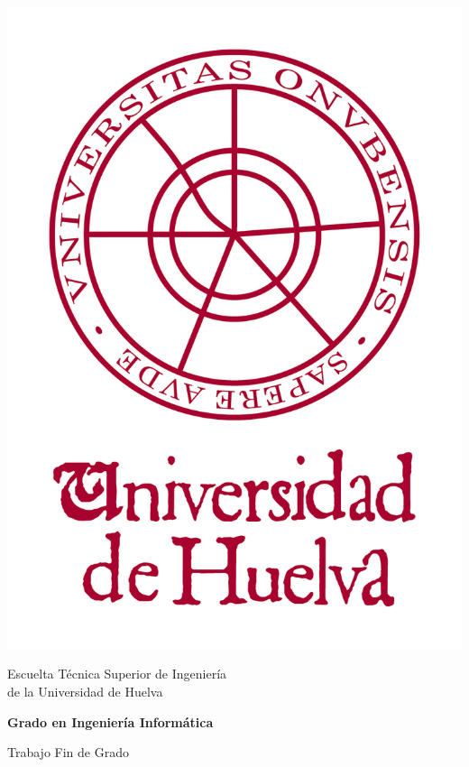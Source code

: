 \thispagestyle{empty}

{


\thispagestyle{empty}
\begin{center}
\includegraphics[scale=.6]{img/logouhu}
\end{center}

\vspace*{0cm}
\Large 

\begin{center}

{\normalsize \sc Escuelta Técnica Superior de Ingeniería \\ de la Universidad de Huelva}

{\large \bf Grado en Ingeniería Informática}

\vspace*{1.5cm}

{\sc Trabajo Fin de Grado}



\end{center}}
